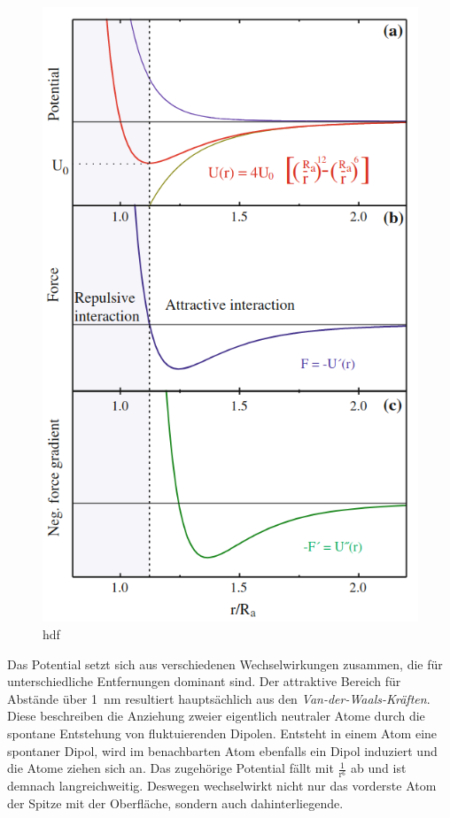           \begin{figure}
            \includegraphics[scale = 0.3]{pictures/LJ.png}
            \caption{hdf}
            \label{fig:LJ}
          \end{figure}

          \FloatBarrier

          Das Potential setzt sich aus verschiedenen Wechselwirkungen zusammen, die für unterschiedliche Entfernungen dominant sind.\newline 
          Der attraktive Bereich für Abstände über \SI{1}{\nano\metre} resultiert hauptsächlich aus den \textit{Van-der-Waals-Kräften}. Diese beschreiben die Anziehung zweier eigentlich neutraler Atome durch die 
          spontane Entstehung von fluktuierenden Dipolen. Entsteht in einem Atom eine 
          spontaner Dipol, wird im benachbarten Atom ebenfalls ein Dipol induziert und die Atome ziehen sich an. Das zugehörige Potential fällt mit $\frac{1}{\text{r}^6}$ ab und ist demnach langreichweitig. 
          Deswegen wechselwirkt nicht nur das vorderste Atom der Spitze mit der Oberfläche, sondern auch dahinterliegende.\newline

